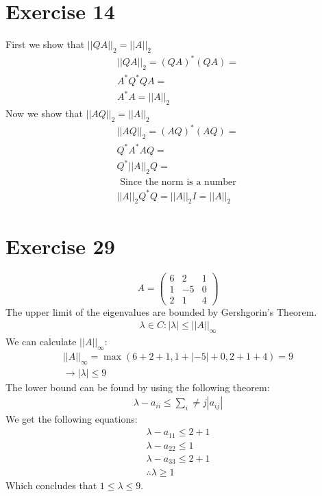 \section{Exercise 14}
First we show that $||QA||_2 = ||A||_2$
\begin{gather*}
|| QA ||_2 = (QA)^*(QA) = \\
A^*Q^*QA = \\
A^*A=
||A||_2
\end{gather*}
Now we show that $||AQ||_2 = ||A||_2$
\begin{gather*}
||AQ||_2 = (AQ)^*(AQ) = \\
Q^*A^*AQ = \\
Q^* ||A||_2 Q = \\
\text{ Since the norm is a number } \\
||A||_2 Q^*Q = ||A||_2 I = ||A||_2 
\end{gather*}

\section{Exercise 29}
\begin{equation*}
A = \left( \begin{array}{ccc}
6 &2 &1\\
1&-5 &0 \\
2&1 &4
\end{array} \right)
\end{equation*}
The upper limit of the eigenvalues are bounded by Gershgorin's Theorem.
\begin{gather*}
\lambda \in C : | \lambda | \leq || A ||_{\infty}
\end{gather*}
We can calculate $||A||_{\infty}$:
\begin{gather*}
||A||_{\infty} = \max (6+2+1,1+|-5|+0, 2+1+4)= 9 \\ \rightarrow |\lambda| \leq 9
\end{gather*}
The lower bound can be found by using the following theorem:
\begin{gather*}
\lambda-a_{ii} \leq \sum\limits_i \neq j | a_{ij}|
\end{gather*}
We get the following equations:
\begin{gather*}
\lambda - a_{11} \leq 2+1 \\
\lambda - a_{22} \leq 1 \\
\lambda - a_{33} \leq 2+1 \\
\therefore \lambda \geq 1
\end{gather*}
Which concludes that $1 \leq \lambda \leq 9 $.